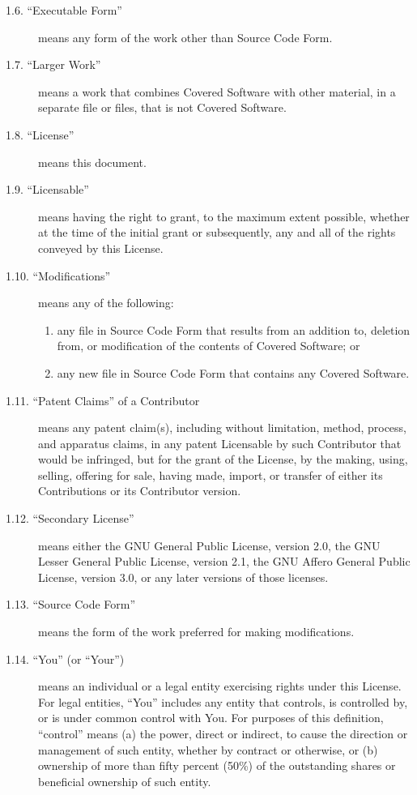 \documentclass[letterpaper,10pt,english]{sphinxmanual}
\begin{document}
\begin{description}
\item[{1.6. “Executable Form”}] \leavevmode
means any form of the work other than Source Code Form.

\item[{1.7. “Larger Work”}] \leavevmode
means a work that combines Covered Software with other material, in
a separate file or files, that is not Covered Software.

\item[{1.8. “License”}] \leavevmode
means this document.

\item[{1.9. “Licensable”}] \leavevmode
means having the right to grant, to the maximum extent possible,
whether at the time of the initial grant or subsequently, any and
all of the rights conveyed by this License.

\item[{1.10. “Modifications”}] \leavevmode
means any of the following:
\begin{enumerate}
\item {} 
any file in Source Code Form that results from an addition to,
deletion from, or modification of the contents of Covered
Software; or

\item {} 
any new file in Source Code Form that contains any Covered
Software.

\end{enumerate}

\item[{1.11. “Patent Claims” of a Contributor}] \leavevmode
means any patent claim(s), including without limitation, method,
process, and apparatus claims, in any patent Licensable by such
Contributor that would be infringed, but for the grant of the
License, by the making, using, selling, offering for sale, having
made, import, or transfer of either its Contributions or its
Contributor version.

\item[{1.12. “Secondary License”}] \leavevmode
means either the GNU General Public License, version 2.0, the GNU
Lesser General Public License, version 2.1, the GNU Affero General
Public License, version 3.0, or any later versions of those
licenses.

\item[{1.13. “Source Code Form”}] \leavevmode
means the form of the work preferred for making modifications.

\item[{1.14. “You” (or “Your”)}] \leavevmode
means an individual or a legal entity exercising rights under this
License. For legal entities, “You” includes any entity that
controls, is controlled by, or is under common control with You. For
purposes of this definition, “control” means (a) the power, direct
or indirect, to cause the direction or management of such entity,
whether by contract or otherwise, or (b) ownership of more than
fifty percent (50\%) of the outstanding shares or beneficial
ownership of such entity.

\end{description}
\end{document}
